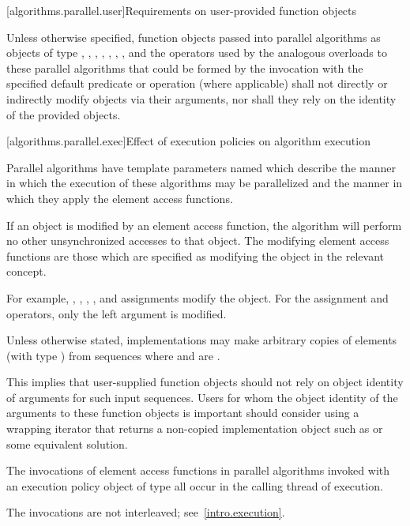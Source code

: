 [algorithms.parallel.user]{Requirements on user-provided function objects}

\pnum
Unless otherwise specified, function objects passed into parallel algorithms as
objects of type , , ,
, , ,
, and the operators used by the analogous overloads to
these parallel algorithms that could be formed by the invocation with the
specified default predicate or operation (where applicable) shall not directly
or indirectly modify objects via their arguments, nor shall they rely on the
identity of the provided objects.

[algorithms.parallel.exec]{Effect of execution policies on algorithm execution}

\pnum
Parallel algorithms have template parameters
named 
which describe the manner in which the execution of these algorithms may be
parallelized and the manner in which they apply the element access functions.

\pnum
If an object is modified by an element access function,
the algorithm will perform no other unsynchronized accesses to that object.
The modifying element access functions are those
which are specified as modifying the object in the relevant concept.
\begin{note}
For example,
, \tcode{++}, \tcode{--}, , and assignments
modify the object.
For the assignment and  operators,
only the left argument is modified.
\end{note}

\pnum
Unless otherwise stated, implementations may make arbitrary copies of elements
(with type ) from sequences where 
and  are .
\begin{note}
This implies that user-supplied function objects should not rely on object
identity of arguments for such input sequences. Users for whom the object
identity of the arguments to these function objects is important should
consider using a wrapping iterator that returns a non-copied implementation
object such as  or some equivalent
solution.
\end{note}

\pnum
The invocations of element access functions in parallel algorithms invoked with
an execution policy object of type  all occur
in the calling thread of execution.
\begin{note}
The invocations are not interleaved; see~\ref{intro.execution}.
\end{note}

